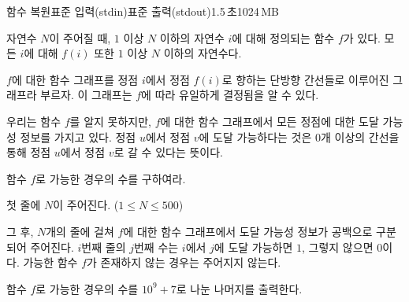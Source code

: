 \begin{problem}{함수 복원}{표준 입력(stdin)}{표준 출력(stdout)}{1.5\,초}{1024\,MB}

자연수 $N$이 주어질 때, $1$ 이상 $N$ 이하의 자연수 $i$에 대해 정의되는 함수 $f$가 있다. 모든 $i$에 대해 $f\left(i\right)$ 또한 $1$ 이상 $N$ 이하의 자연수다.

$f$에 대한 함수 그래프를 정점 $i$에서 정점 $f\left(i\right)$로 향하는 단방향 간선들로 이루어진 그래프라 부르자. 이 그래프는 $f$에 따라 유일하게 결정됨을 알 수 있다.

우리는 함수 $f$를 알지 못하지만, $f$에 대한 함수 그래프에서 모든 정점에 대한 도달 가능성 정보를 가지고 있다. 정점 $u$에서 정점 $v$에 도달 가능하다는 것은 $0$개 이상의 간선을 통해 정점 $u$에서 정점 $v$로 갈 수 있다는 뜻이다.

함수 $f$로 가능한 경우의 수를 구하여라.

\InputFile
첫 줄에 $N$이 주어진다. ($1 \leq N \leq 500$)

그 후, $N$개의 줄에 걸쳐 $f$에 대한 함수 그래프에서 도달 가능성 정보가 공백으로 구분되어 주어진다. $i$번째 줄의 $j$번째 수는 $i$에서 $j$에 도달 가능하면 $1$, 그렇지 않으면 $0$이다. 가능한 함수 $f$가 존재하지 않는 경우는 주어지지 않는다.

\OutputFile
함수 $f$로 가능한 경우의 수를 $10^9 + 7$로 나눈 나머지를 출력한다. 

\Examples

\begin{example}
%
%
\end{example}

\end{problem}

